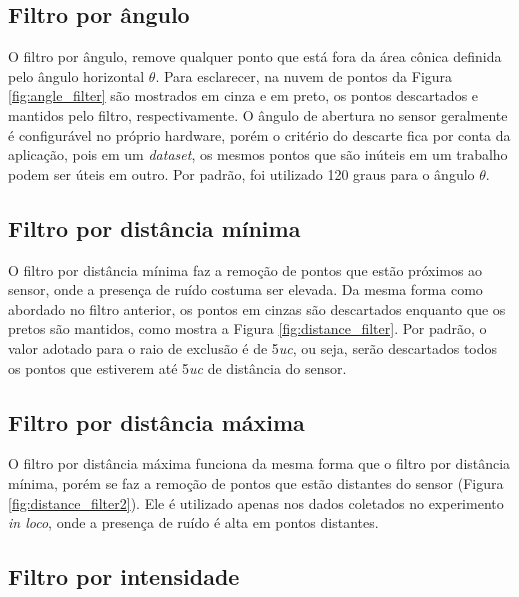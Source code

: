 \subsection{Filtro por ângulo}
\label{sec:angle_filter}

O filtro por ângulo, remove qualquer ponto que está fora da área cônica definida pelo ângulo horizontal $\theta$. Para esclarecer, na nuvem de pontos da Figura \ref{fig:angle_filter} são mostrados em cinza e em preto, os pontos descartados e mantidos pelo filtro, respectivamente.
O ângulo de abertura no sensor geralmente é configurável no próprio hardware, porém o critério do descarte fica por conta da aplicação, pois em um \textit{dataset}, os mesmos pontos que são inúteis em um trabalho podem ser úteis em outro. 
Por padrão, foi utilizado 120 graus para o ângulo $\theta$.

\subsection{Filtro por distância mínima}
\label{sec:distance_filter}

O filtro por distância mínima faz a remoção de pontos que estão próximos ao sensor, onde a presença de ruído costuma ser elevada. 
Da mesma forma como abordado no filtro anterior, os pontos em cinzas são descartados enquanto que os pretos são mantidos, como mostra a Figura \ref{fig:distance_filter}. 
Por padrão, o valor adotado para o raio de exclusão é de 5\textit{uc}, ou seja, serão descartados todos os pontos que estiverem até 5\textit{uc} de distância do sensor.

\subsection{Filtro por distância máxima}
\label{sec:distance_filter2}

O filtro por distância máxima funciona da mesma forma que o filtro por distância mínima, porém se faz a remoção de pontos que estão distantes do sensor (Figura \ref{fig:distance_filter2}).
Ele é utilizado apenas nos dados coletados no experimento \textit{in loco}, onde a presença de ruído é alta em pontos distantes.

\subsection{Filtro por intensidade}
\label{sec:intensity_filter}

